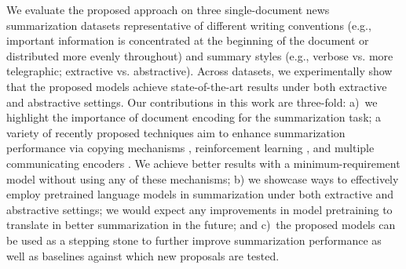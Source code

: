 \documentclass[11pt,a4paper]{article}
\begin{document}
    
    We evaluate the proposed approach on three single-document news
    summarization datasets representative of different writing
    conventions (e.g., important information is concentrated at the
    beginning of the document or distributed more evenly throughout)
    and summary styles (e.g., verbose vs. more telegraphic; extractive
    vs. abstractive). Across datasets, we experimentally show that the
    proposed models achieve state-of-the-art results under both
    extractive and abstractive settings. Our contributions in this
    work are three-fold: a)~we highlight the importance of document
    encoding for the summarization task; a variety of recently
    proposed techniques aim to enhance summarization performance via
    copying mechanisms \cite{gu-etal-2016-incorporating,see-acl17,nallapati2017summarunner},
    reinforcement learning \cite{narayan2018ranking,paulus2017deep,dong2018banditsum},
    and multiple communicating encoders \cite{celikyilmaz2018deep}. We
    achieve better results with a minimum-requirement model without
    using any of these mechanisms; b) we showcase ways to effectively
    employ pretrained language models in summarization under both
    extractive and abstractive settings; we would expect any
    improvements in model pretraining to translate in better
    summarization in the future; and c)~the proposed models can be
    used as a stepping stone to further improve summarization
    performance as well as baselines against which new proposals are
    tested.
    
    
    
\end{document}
